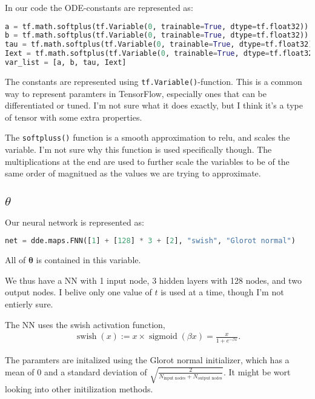 \documentclass[a4paper]{article}
\begin{document}
In our code the ODE-constants are represented as:
\begin{lstlisting}[language=python]
a = tf.math.softplus(tf.Variable(0, trainable=True, dtype=tf.float32)) * .1
b = tf.math.softplus(tf.Variable(0, trainable=True, dtype=tf.float32))
tau = tf.math.softplus(tf.Variable(0, trainable=True, dtype=tf.float32)) * 10
Iext = tf.math.softplus(tf.Variable(0, trainable=True, dtype=tf.float32)) * .1
var_list = [a, b, tau, Iext]
\end{lstlisting}
The constants are represented using \lstinline|tf.Variable()|-function. This is a common way to represent paramters in TensorFlow, especially ones that can be differentiated or tuned.
I'm not sure what it does exactly, but I think it's a type of tensor with some extra properties. 

The \lstinline|softpluss()| function is a smooth approximation to relu, and scales the variable. I'm not sure why this function is used specifically though. 
The multiplications at the end are used to further scale the variables to be of the same order of magnitued as the values we are trying to approximate. 


\subsection{$\theta$}

Our neural network is represented as:
\begin{lstlisting}[language=python]
net = dde.maps.FNN([1] + [128] * 3 + [2], "swish", "Glorot normal")
\end{lstlisting}
All of $\boldsymbol{\theta}$ is contained in this variable. 

We thus have a NN with 1 input node, 3 hidden layers with 128 nodes, and two output nodes. 
I belive only one value of $t$ is used at a time, though I'm not entierly sure. 

The NN uses the swish activation function,
\begin{align}
	\operatorname{swish}(x):=x \times \operatorname{sigmoid}(\beta x)=\frac{x}{1+e^{-\beta x}}.
\end{align}

The paramters are initalized using the Glorot normal initializer, which has a mean of 0 and a standard deviation of $\sqrt{\frac{2}{N_{\text{input nodes}} + N_{\text{output nodes}}}}$. It might be wort looking into other initilization methods. 
\end{document}
